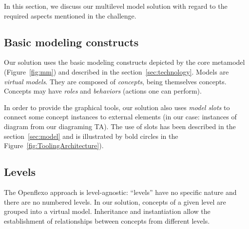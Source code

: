 In this section, we discuss our multilevel model solution with regard to the required aspects 
mentioned in the challenge.


  \subsection{Basic modeling constructs}


  Our solution uses the basic modeling constructs depicted by the \FML core
  metamodel (Figure~\ref{fig:mm}) and described in
  the section~\ref{sec:technology}. Models are \emph{virtual models}. They are
  composed of \emph{concepts}, being themselves concepts. Concepts may have
  \emph{roles} and \emph{behaviors} (actions one can perform).

  In order to provide the graphical tools, our solution also uses \emph{model
  slots} to connect some concept instances to external elements (in our case:
  instances of diagram from our diagraming TA). The use of slots has been
  described in the section~\ref{sec:model} and is illustrated by bold circles in
  the Figure~\ref{fig:ToolingArchitecture}).


  \subsection{Levels}


  The Openflexo approach is level-agnostic: ``levels'' have no specific nature
  and there are no numbered levels. In our solution, concepts of a given level
  are grouped into a virtual model. Inheritance and instantiation allow the
  establishment of relationships between concepts from different levels.

